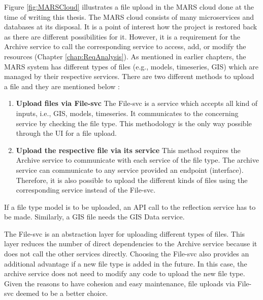 Figure \ref{fig:MARSCloud} illustrates a file upload in the MARS cloud done at the time of writing this thesis. 
The MARS cloud consists of many 
microservices and databases at its disposal. It is a point of interest how the project is restored back as there are different possibilities for it. 
However, it is a requirement for the Archive service
to call the corresponding service to access, add, or modify the resources (Chapter \ref{chap:ReqAnalysis}). As mentioned in earlier chapters, the MARS system
has different types of files (e.g., models, timeseries, GIS) which are managed by their respective services. There are two different methods to upload a file 
and they are mentioned below :
\begin{enumerate}
 \item \textbf{Upload files via File-svc} The File-svc is a service which accepts all kind of inputs, i.e., GIS, models, timeseries. It communicates to the
 concerning service by checking the file type. This methodology is the only way possible through the UI for a file upload.   
 \item \textbf{Upload the respective file via its service} This method requires the Archive service to communicate with each service of the file type. 
The archive service can communicate to any service provided an endpoint (interface). Therefore, it is also possible to upload the different kinds of files using the
corresponding service instead of the File-svc. 
\end{enumerate} 

If a file type model is to be uploaded, an API call to the reflection service has to be made. Similarly, a GIS
file needs the GIS Data service.

The File-svc is an abstraction layer for uploading different types of files. This layer reduces the number of direct dependencies to the Archive
service because it does not call the other services directly. Choosing the File-svc also provides an additional advantage if a new file type is added in the future.
In this case, the archive service does not need to modify any code to upload the new file type. Given the reasons to have cohesion and easy maintenance, file uploads
via File-svc deemed to be a better choice. 

